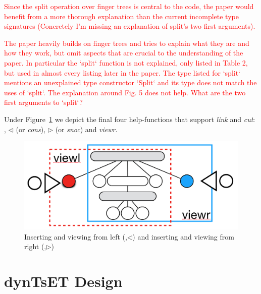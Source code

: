 \documentclass{elsarticle}
\newcommand{\code}[1]{\haskell{#1}}
\newcommand{\tcr} [1]{\textcolor{red}{#1}}
\begin{document}
\tcr{Since the split operation over finger trees is central to the code, the paper would benefit from a more thorough explanation than the current incomplete type signatures (Concretely I'm missing an explanation of split's two first arguments).}


\tcr{The paper heavily builds on finger trees and tries to explain what they are and how they work, but omit aspects that are crucial to the understanding of the paper. In particular the `split` function is not explained, only listed in Table 2, but used in almost every listing later in the paper. The type listed for `split` mentions an unexplained type constructor `Split` and its type does not match the uses of `split`. The explanation around Fig. 5 does not help. What are the two first arguments to `split`?}




Under Figure~\ref{fig:consleftsnocright} we depict the final four help-functions that support \textit{link} and \textit{cut}: \code{viewl}, $\lhd$ (or \textit{cons}), $\rhd$ (or \textit{snoc}) and \textit{viewr}.
\begin{figure}
\begin{center}
\includegraphics[scale=0.25]{./Images/consleftsnocright} 
\end{center}
\caption{Inserting and viewing from left (\code{viewl},$\lhd$) and inserting and viewing from right (\code{viewr},$\rhd$) }
\label{fig:consleftsnocright}
\end{figure}









\section{dynTsET Design}
\label{sec:TechDes}  
\end{document}
